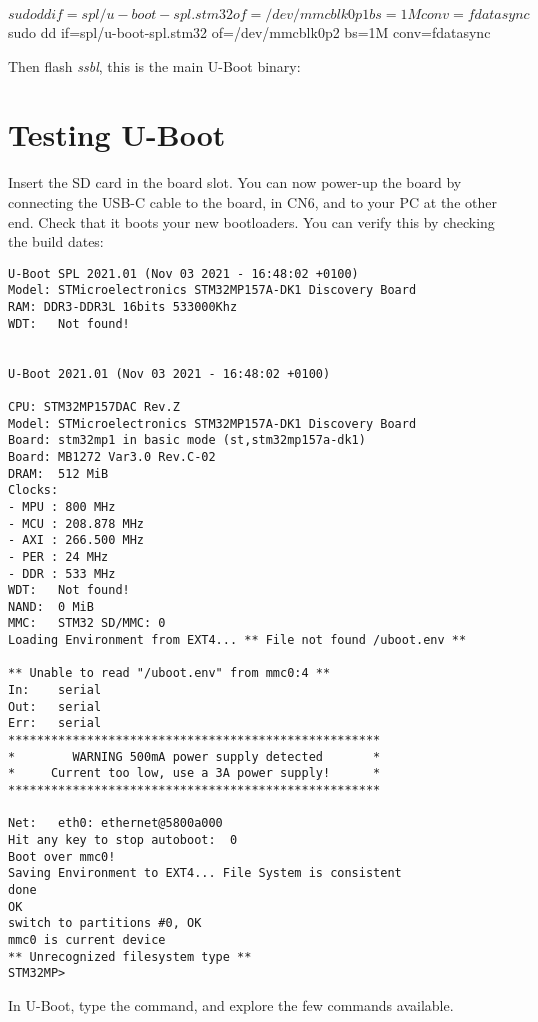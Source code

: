 \begin{bashinput}
$ sudo dd if=spl/u-boot-spl.stm32 of=/dev/mmcblk0p1 bs=1M conv=fdatasync
$ sudo dd if=spl/u-boot-spl.stm32 of=/dev/mmcblk0p2 bs=1M conv=fdatasync
\end{bashinput}

Then flash {\em ssbl}, this is the main U-Boot binary:


\section{Testing U-Boot}

Insert the SD card in the board slot. You can now power-up the board
by connecting the USB-C cable to the board, in CN6,  and
to your PC at the other end. Check that it boots your new bootloaders.
You can verify this by checking the build dates:

\begin{verbatim}
U-Boot SPL 2021.01 (Nov 03 2021 - 16:48:02 +0100)
Model: STMicroelectronics STM32MP157A-DK1 Discovery Board
RAM: DDR3-DDR3L 16bits 533000Khz
WDT:   Not found!


U-Boot 2021.01 (Nov 03 2021 - 16:48:02 +0100)

CPU: STM32MP157DAC Rev.Z
Model: STMicroelectronics STM32MP157A-DK1 Discovery Board
Board: stm32mp1 in basic mode (st,stm32mp157a-dk1)
Board: MB1272 Var3.0 Rev.C-02
DRAM:  512 MiB
Clocks:
- MPU : 800 MHz
- MCU : 208.878 MHz
- AXI : 266.500 MHz
- PER : 24 MHz
- DDR : 533 MHz
WDT:   Not found!
NAND:  0 MiB
MMC:   STM32 SD/MMC: 0
Loading Environment from EXT4... ** File not found /uboot.env **

** Unable to read "/uboot.env" from mmc0:4 **
In:    serial
Out:   serial
Err:   serial
****************************************************
*        WARNING 500mA power supply detected       *
*     Current too low, use a 3A power supply!      *
****************************************************

Net:   eth0: ethernet@5800a000
Hit any key to stop autoboot:  0
Boot over mmc0!
Saving Environment to EXT4... File System is consistent
done
OK
switch to partitions #0, OK
mmc0 is current device
** Unrecognized filesystem type **
STM32MP>
\end{verbatim}

In U-Boot, type the  command, and explore the few commands
available.

